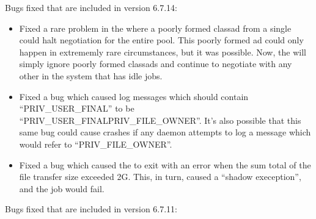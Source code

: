 \noindent Bugs fixed that are included in version 6.7.14:

\begin{itemize}

\item Fixed a rare problem in the  where a poorly
  formed classad from a single  could halt negotiation
  for the entire pool.
  This poorly formed ad could only happen in extrememly rare
  circumstances, but it was possible.
  Now, the  will simply ignore poorly formed
  classads and continue to negotiate with any other  in
  the system that has idle jobs.

\item Fixed a bug which caused log messages which should contain
  ``PRIV\_USER\_FINAL'' to be ``PRIV\_USER\_FINALPRIV\_FILE\_OWNER''.
  It's also possible that this same bug could cause crashes if any
  daemon attempts to log a message which would refer to
  ``PRIV\_FILE\_OWNER''.

\item Fixed a bug which caused the  to exit with an
  error when the sum total of the file transfer size exceeded 2G.
  This, in turn, caused a ``shadow exeception'', and the job would
  fail.

\end{itemize}


\noindent Bugs fixed that are included in version 6.7.11:

